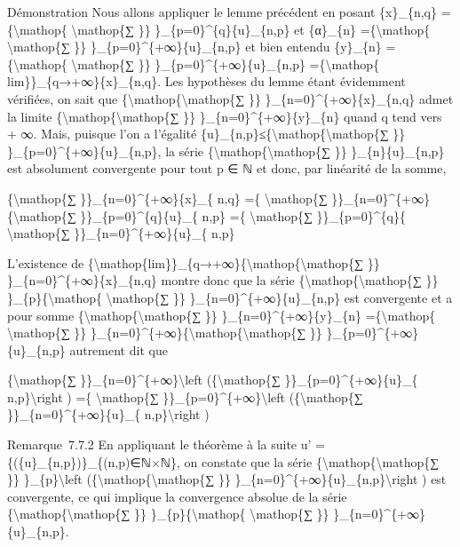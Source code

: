 \documentclass[]{article}
\begin{document}
Démonstration Nous allons appliquer le lemme précédent en posant
\{x\}\_\{n,q\} =\{\textbackslash{}mathop\{ \textbackslash{}mathop\{∑
\}\} \}\_\{p=0\}\^{}\{q\}\{u\}\_\{n,p\} et \{α\}\_\{n\}
=\{\textbackslash{}mathop\{ \textbackslash{}mathop\{∑ \}\}
\}\_\{p=0\}\^{}\{+∞\}\textbar{}\{u\}\_\{n,p\}\textbar{} et bien entendu
\{y\}\_\{n\} =\{\textbackslash{}mathop\{ \textbackslash{}mathop\{∑ \}\}
\}\_\{p=0\}\^{}\{+∞\}\{u\}\_\{n,p\} =\{\textbackslash{}mathop\{
lim\}\}\_\{q→+∞\}\{x\}\_\{n,q\}. Les hypothèses du lemme étant
évidemment vérifiées, on sait que
\{\textbackslash{}mathop\{\textbackslash{}mathop\{∑ \}\}
\}\_\{n=0\}\^{}\{+∞\}\{x\}\_\{n,q\} admet la limite
\{\textbackslash{}mathop\{\textbackslash{}mathop\{∑ \}\}
\}\_\{n=0\}\^{}\{+∞\}\{y\}\_\{n\} quand q tend vers + ∞. Mais, puisque
l'on a l'égalité
\textbar{}\{u\}\_\{n,p\}\textbar{}≤\{\textbackslash{}mathop\{\textbackslash{}mathop\{∑
\}\} \}\_\{p=0\}\^{}\{+∞\}\textbar{}\{u\}\_\{n,p\}\textbar{}, la série
\{\textbackslash{}mathop\{\textbackslash{}mathop\{∑ \}\}
\}\_\{n\}\{u\}\_\{n,p\} est absolument convergente pour tout p ∈ ℕ et
donc, par linéarité de la somme,

\{\textbackslash{}mathop\{∑ \}\}\_\{n=0\}\^{}\{+∞\}\{x\}\_\{ n,q\} =\{
\textbackslash{}mathop\{∑
\}\}\_\{n=0\}\^{}\{+∞\}\{\textbackslash{}mathop\{∑
\}\}\_\{p=0\}\^{}\{q\}\{u\}\_\{ n,p\} =\{ \textbackslash{}mathop\{∑
\}\}\_\{p=0\}\^{}\{q\}\{ \textbackslash{}mathop\{∑
\}\}\_\{n=0\}\^{}\{+∞\}\{u\}\_\{ n,p\}

L'existence de
\{\textbackslash{}mathop\{lim\}\}\_\{q→+∞\}\{\textbackslash{}mathop\{\textbackslash{}mathop\{∑
\}\} \}\_\{n=0\}\^{}\{+∞\}\{x\}\_\{n,q\} montre donc que la série
\{\textbackslash{}mathop\{\textbackslash{}mathop\{∑ \}\}
\}\_\{p\}\{\textbackslash{}mathop\{ \textbackslash{}mathop\{∑ \}\}
\}\_\{n=0\}\^{}\{+∞\}\{u\}\_\{n,p\} est convergente et a pour somme
\{\textbackslash{}mathop\{\textbackslash{}mathop\{∑ \}\}
\}\_\{n=0\}\^{}\{+∞\}\{y\}\_\{n\} =\{\textbackslash{}mathop\{
\textbackslash{}mathop\{∑ \}\}
\}\_\{n=0\}\^{}\{+∞\}\{\textbackslash{}mathop\{\textbackslash{}mathop\{∑
\}\} \}\_\{p=0\}\^{}\{+∞\}\{u\}\_\{n,p\} autrement dit que

\{\textbackslash{}mathop\{∑ \}\}\_\{n=0\}\^{}\{+∞\}\textbackslash{}left
(\{\textbackslash{}mathop\{∑ \}\}\_\{p=0\}\^{}\{+∞\}\{u\}\_\{
n,p\}\textbackslash{}right ) =\{ \textbackslash{}mathop\{∑
\}\}\_\{p=0\}\^{}\{+∞\}\textbackslash{}left (\{\textbackslash{}mathop\{∑
\}\}\_\{n=0\}\^{}\{+∞\}\{u\}\_\{ n,p\}\textbackslash{}right )

Remarque~7.7.2 En appliquant le théorème à la suite u' =
\{(\textbar{}\{u\}\_\{n,p\}\textbar{})\}\_\{(n,p)∈ℕ×ℕ\}, on constate que
la série \{\textbackslash{}mathop\{\textbackslash{}mathop\{∑ \}\}
\}\_\{p\}\textbackslash{}left
(\{\textbackslash{}mathop\{\textbackslash{}mathop\{∑ \}\}
\}\_\{n=0\}\^{}\{+∞\}\textbar{}\{u\}\_\{n,p\}\textbar{}\textbackslash{}right
) est convergente, ce qui implique la convergence absolue de la série
\{\textbackslash{}mathop\{\textbackslash{}mathop\{∑ \}\}
\}\_\{p\}\{\textbackslash{}mathop\{ \textbackslash{}mathop\{∑ \}\}
\}\_\{n=0\}\^{}\{+∞\}\{u\}\_\{n,p\}.
\end{document}
